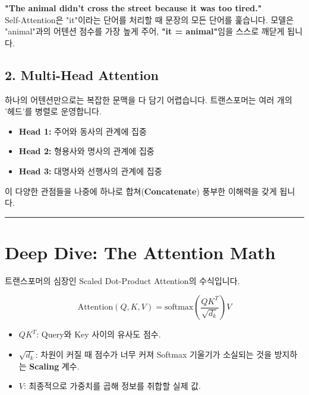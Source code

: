 \documentclass[11pt,a4paper]{book}
\theoremstyle{definition}
\begin{document}
\begin{analogybox}[title={"it"은 누구인가?}]
\textbf{"The animal didn't cross the street because it was too tired."} \\
Self-Attention은 "it"이라는 단어를 처리할 때 문장의 모든 단어를 훑습니다.
모델은 "animal"과의 어텐션 점수를 가장 높게 주어, \textbf{"it = animal"}임을 스스로 깨닫게 됩니다.
\end{analogybox}


\subsection{2. Multi-Head Attention}
하나의 어텐션만으로는 복잡한 문맥을 다 담기 어렵습니다. 트랜스포머는 여러 개의 '헤드'를 병렬로 운영합니다.

\begin{itemize}
    \item \textbf{Head 1:} 주어와 동사의 관계에 집중
    \item \textbf{Head 2:} 형용사와 명사의 관계에 집중
    \item \textbf{Head 3:} 대명사와 선행사의 관계에 집중
\end{itemize}
이 다양한 관점들을 나중에 하나로 합쳐(\textbf{Concatenate}) 풍부한 이해력을 갖게 됩니다.

\vspace{0.5cm}\hrule\vspace{0.5cm}

\section{Deep Dive: The Attention Math}

트랜스포머의 심장인 Scaled Dot-Product Attention의 수식입니다.

\begin{formulabox}[title={Scaled Dot-Product Attention}]
$$ \text{Attention}(Q, K, V) = \text{softmax}\left(\frac{QK^T}{\sqrt{d_k}}\right)V $$
\begin{itemize}
    \item $QK^T$: Query와 Key 사이의 유사도 점수.
    \item $\sqrt{d_k}$: 차원이 커질 때 점수가 너무 커져 Softmax 기울기가 소실되는 것을 방지하는 \textbf{Scaling} 계수.
    \item $V$: 최종적으로 가중치를 곱해 정보를 취합할 실제 값.
\end{itemize}
\end{formulabox}


\end{document}
